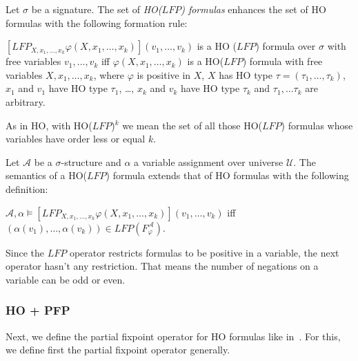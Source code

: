 \begin{definition}
    Let $\sigma$ be a signature. The set of \emph{HO($\mathit{LFP}$) formulas} enhances the set of HO formulas with the
    following formation rule:
    \begin{compactitem}
        \item $[\mathit{LFP}_{X, x_1, \dots, x_k}\varphi(X, x_1, \dots, x_k)](v_1, \dots, v_k)$ is a HO
        ($\mathit{LFP}$) formula over $\sigma$ with free variables $v_1, \dots, v_k$ iff $\varphi(X, x_1, \dots, x_k)
        $ is a HO($\mathit{LFP}$) formula with free variables $X, x_1, \dots, x_k$, where $\varphi$ is positive in
        $X$, $X$ has HO type $\tau = (\tau_1, \dots, \tau_k)$, $x_1$ and $v_1$ have HO type $\tau_1$, \dots, $x_k$
        and $v_k$ have HO type $\tau_k$ and $\tau_1, \dots \tau_k$ are arbitrary.
    \end{compactitem}
\end{definition}

As in HO, with HO($\mathit{LFP}$)$^k$ we mean the set of all those HO($\mathit{LFP}$) formulas whose variables have
order less or equal $k$.

\begin{definition}
    Let $\mathcal{A}$ be a $\sigma$-structure and $\alpha$ a variable assignment over universe $\mathcal{U}$. The
    semantics of a HO($\mathit{LFP}$) formula extends that of HO formulas with the following definition:
    \begin{compactitem}
        \item $\mathcal{A}, \alpha \models [\mathit{LFP}_{X, x_1, \dots, x_k}\varphi(X, x_1, \dots, x_k)](v_1, \dots,
        v_k)$ iff $(\alpha(v_1), \dots, \alpha(v_k)) \in \mathit{LFP}(F_\varphi^\mathcal{A})$.
    \end{compactitem}
\end{definition}

Since the $\mathit{LFP}$ operator restricts formulas to be positive in a variable, the next operator hasn't any
restriction. That means the number of negations on a variable can be odd or even.

\subsubsection{HO + PFP}

Next, we define the partial fixpoint operator for HO formulas like in~\cite{schewe2006fixpoint}. For this, we define
first the partial fixpoint operator generally.


